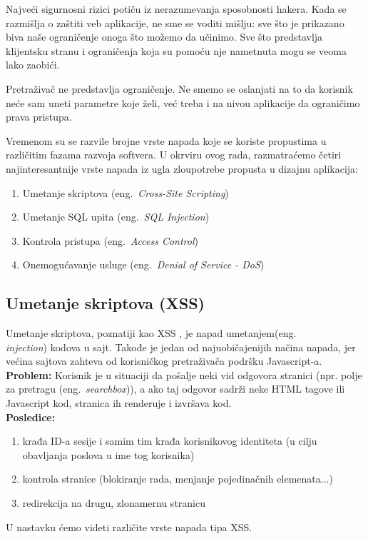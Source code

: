 \documentclass[a4paper]{article}
\begin{document}
Najveći sigurnosni rizici potiču iz nerazumevanja sposobnosti hakera. Kada se razmišlja o zaštiti veb aplikacije, ne sme se voditi mišlju: sve što je prikazano biva naše ograničenje onoga što možemo da učinimo. Sve što predstavlja klijentsku stranu i ograničenja koja su pomoću nje nametnuta mogu se veoma lako zaobići.

Pretraživač ne predstavlja ograničenje. Ne smemo se oslanjati na to da korisnik neće sam uneti parametre koje želi, već treba i na nivou aplikacije da ograničimo prava pristupa.

Vremenom su se razvile brojne vrste napada koje se koriste propustima u različitim fazama razvoja softvera. U okrviru ovog rada, razmatraćemo četiri najinteresantnije vrste napada iz ugla zloupotrebe propusta u dizajnu aplikacija:
\begin{enumerate}
	\item Umetanje skriptova (eng.~{\em Cross-Site Scripting})
	\item Umetanje SQL upita (eng.~{\em SQL Injection})
	\item Kontrola pristupa (eng.~{\em Access Control})
	\item Onemogućavanje usluge (eng.~{\em Denial of Service - DoS})
\end{enumerate}
\subsection{Umetanje skriptova (XSS)}
Umetanje skriptova, poznatiji kao XSS \cite{XSS}, je napad umetanjem(eng.~{\em \\injection}) kodova u sajt. Takođe je jedan od najuobičajenijih načina napada, jer većina sajtova zahteva od korisničkog pretraživača podršku Javascript-a.\\
\textbf{Problem:} Korisnik je u situaciji da pošalje neki vid odgovora stranici (npr. polje za pretragu (eng.~{\em searchbox})), a ako taj odgovor sadrži neke HTML tagove ili Javascript kod, stranica ih renderuje i izvršava kod.\\
\textbf{Posledice:}
\begin{enumerate}
	\item krađa ID-a sesije i samim tim krađa korisnikovog identiteta (u cilju obavljanja poslova u ime tog korisnika)
	\item kontrola stranice (blokiranje rada, menjanje pojedinačnih elemenata...)
	\item redirekcija na drugu, zlonamernu stranicu
\end{enumerate}
U nastavku ćemo videti različite vrste napada tipa XSS.
\end{document}
